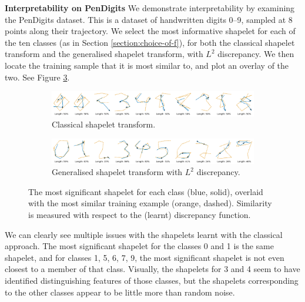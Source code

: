 \documentclass{article}
\theoremstyle{plain}
\theoremstyle{definition}
\newcommand{\boldheading}[1]{

\textbf{#1}\quad}
\begin{document}
\boldheading{Interpretability on PenDigits}
We demonstrate interpretability by examining the PenDigits dataset. This is a dataset of handwritten digits 0--9, sampled at 8 points along their trajectory. We select the most informative shapelet for each of the ten classes (as in Section \ref{section:choice-of-f}), for both the classical shapelet transform and the generalised shapelet transform, with $L^2$ discrepancy. We then locate the training sample that it is most similar to, and plot an overlay of the two. See Figure \ref{fig:pendigits}.

\begin{figure}[b]
\vspace{0.25em}
    \begin{subfigure}[b]{\linewidth}
        \centering
        \includegraphics[width=\linewidth]{images/old_pendigits.png}
        \caption{Classical shapelet transform.}
        \label{fig:old_shapelets}
    \end{subfigure}
    \begin{subfigure}[b]{\linewidth}
        \centering
        \includegraphics[width=\linewidth]{images/new_pendigits.png}
        \caption{Generalised shapelet transform with $L^2$ discrepancy.}
        \label{fig:new_shapelets}
    \end{subfigure}
    \caption{The most significant shapelet for each class (blue, solid), overlaid with the most similar training example (orange, dashed). Similarity is measured with respect to the (learnt) discrepancy function.}
    \label{fig:pendigits}
\end{figure}

We can clearly see multiple issues with the shapelets learnt with the classical approach. The most significant shapelet for the classes 0 and 1 is the same shapelet, and for classes 1, 5, 6, 7, 9, the most significant shapelet is not even closest to a member of that class. Visually, the shapelets for 3 and 4 seem to have identified distinguishing features of those classes, but the shapelets corresponding to the other classes appear to be little more than random noise.
\end{document}
